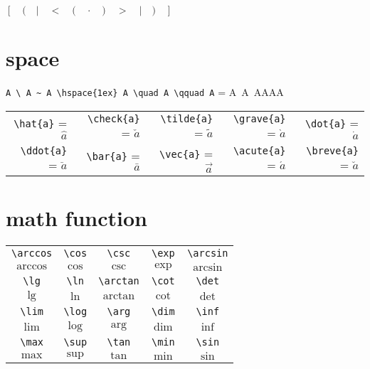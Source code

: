 \documentclass[11pt,a4paper]{article}
\begin{document}
\begin{center}
	$\left[ \quad \Bigg( \quad \bigg| \quad \Big< \quad \big( \quad \cdot \quad \big) \quad \Big> \quad \bigg| \quad \Bigg) \quad \right]$	
\end{center}
\section{space}
\verb|A \ A ~ A \hspace{1ex} A \quad A \qquad A| = A\ A~A\hspace{1ex}A\quad A\qquad A
\\[1ex]
\begin{tabular}[htp]{rrrrr}
	\centering
	\verb|\hat{a}| = $\hat{a}$ & \verb|\check{a}| = $\check{a}$ & \verb|\tilde{a}| = $\tilde{a}$ & \verb|\grave{a}| = $\grave{a}$ & \verb|\dot{a}| = $\dot{a}$ \\
	\verb|\ddot{a}| = $\ddot{a}$ & \verb|\bar{a}| = $\bar{a}$ & \verb|\vec{a}| = $\vec{a}$ & \verb|\acute{a}| = $\acute{a}$ & \verb|\breve{a}| = $\breve{a}$ \\
	\hline
\end{tabular}
\section{math function}
\begin{table}[htb]
	\centering
	\begin{tabular}{ccccc}
		\verb|\arccos| & \verb|\cos| & \verb|\csc| & \verb|\exp| & \verb|\arcsin| \\
		$\arccos$ & $\cos$ & $\csc$ & $\exp$ & $\arcsin$ \\
		\hline
		\verb|\lg| & \verb|\ln| & \verb|\arctan| & \verb|\cot| & \verb|\det| \\
		$\lg$ & $\ln$ & $\arctan$ & $\cot$ & $\det$ \\
		\hline
		\verb|\lim| & \verb|\log| & \verb|\arg| & \verb|\dim| & \verb|\inf| \\
		$\lim$ & $\log$ & $\arg$ & $\dim$ & $\inf$ \\
		\hline
		\verb|\max| & \verb|\sup| & \verb|\tan| & \verb|\min| & \verb|\sin| \\
		$\max$ & $\sup$ & $\tan$ & $\min$ & $\sin$ \\
		\hline
	\end{tabular}
\end{table}
\end{document}
